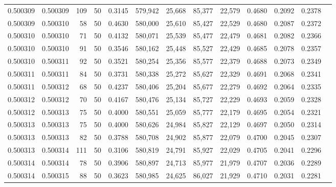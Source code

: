 \begin{tabular}{rrrrrrrrrrrrr}
0.500309 & 0.500309 &   109 &  50 &                                     0.3145 & 579,942 &  25,668 &  85,377 &  22,579 & 0.4680 & 0.2092 & 0.2378 \\
0.500309 & 0.500310 &    58 &  50 &                                     0.4630 & 580,000 &  25,610 &  85,427 &  22,529 & 0.4680 & 0.2087 & 0.2372 \\
0.500310 & 0.500310 &    71 &  50 &                                     0.4132 & 580,071 &  25,539 &  85,477 &  22,479 & 0.4681 & 0.2082 & 0.2366 \\
0.500310 & 0.500310 &    91 &  50 &                                     0.3546 & 580,162 &  25,448 &  85,527 &  22,429 & 0.4685 & 0.2078 & 0.2357 \\
0.500310 & 0.500311 &    92 &  50 &                                     0.3521 & 580,254 &  25,356 &  85,577 &  22,379 & 0.4688 & 0.2073 & 0.2349 \\
0.500311 & 0.500311 &    84 &  50 &                                     0.3731 & 580,338 &  25,272 &  85,627 &  22,329 & 0.4691 & 0.2068 & 0.2341 \\
0.500311 & 0.500312 &    68 &  50 &                                     0.4237 & 580,406 &  25,204 &  85,677 &  22,279 & 0.4692 & 0.2064 & 0.2335 \\
0.500312 & 0.500312 &    70 &  50 &                                     0.4167 & 580,476 &  25,134 &  85,727 &  22,229 & 0.4693 & 0.2059 & 0.2328 \\
0.500312 & 0.500313 &    75 &  50 &                                     0.4000 & 580,551 &  25,059 &  85,777 &  22,179 & 0.4695 & 0.2054 & 0.2321 \\
0.500313 & 0.500313 &    75 &  50 &                                     0.4000 & 580,626 &  24,984 &  85,827 &  22,129 & 0.4697 & 0.2050 & 0.2314 \\
0.500313 & 0.500313 &    82 &  50 &                                     0.3788 & 580,708 &  24,902 &  85,877 &  22,079 & 0.4700 & 0.2045 & 0.2307 \\
0.500313 & 0.500314 &   111 &  50 &                                     0.3106 & 580,819 &  24,791 &  85,927 &  22,029 & 0.4705 & 0.2041 & 0.2296 \\
0.500314 & 0.500314 &    78 &  50 &                                     0.3906 & 580,897 &  24,713 &  85,977 &  21,979 & 0.4707 & 0.2036 & 0.2289 \\
0.500314 & 0.500315 &    88 &  50 &                                     0.3623 & 580,985 &  24,625 &  86,027 &  21,929 & 0.4710 & 0.2031 & 0.2281 \\

\end{tabular}
